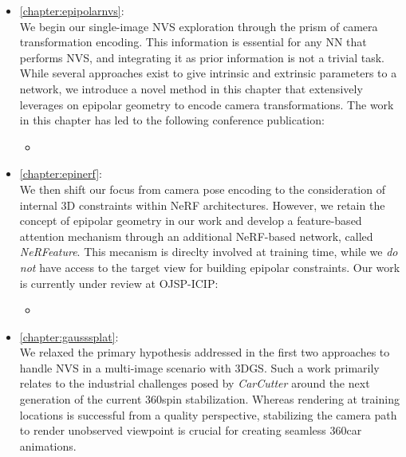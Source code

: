 \begin{itemize}
      \item \autoref{chapter:epipolarnvs}: \\
            We begin our single-image \ac{NVS} exploration through the prism of camera transformation encoding. This information is essential for any \ac{NN} that performs \ac{NVS}, and integrating it as prior information is not a trivial task. While several approaches exist to give intrinsic and extrinsic parameters to a network, we introduce a novel method in this chapter that extensively leverages on epipolar geometry to encode camera transformations. The work in this chapter has led to the following conference publication:
            \begin{itemize}
                \item {}
            \end{itemize}

      \item \autoref{chapter:epinerf}: \\
            We then shift our focus from camera pose encoding to the consideration of internal 3D constraints within \ac{NeRF} architectures. However, we retain the concept of epipolar geometry in our work and develop a feature-based attention mechanism through an additional \ac{NeRF}-based network, called \textit{NeRFeature}. This mecanism is direclty involved at training time, while we \textit{do not} have access to the target view for building epipolar constraints. Our work is currently under review at OJSP-ICIP:
            \begin{itemize}
                  \item {}
            \end{itemize}

      \item \autoref{chapter:gausssplat}: \\
            We relaxed the primary hypothesis addressed in the first two approaches to handle \ac{NVS} in a multi-image scenario with 3D\ac{GS}. Such a work primarily relates to the industrial challenges posed by \textit{CarCutter} around the next generation of the current 360\degree spin stabilization. Whereas rendering at training locations is successful from a quality perspective, stabilizing the camera path to render unobserved viewpoint is crucial for creating seamless 360\degree car animations. 


\end{itemize}
